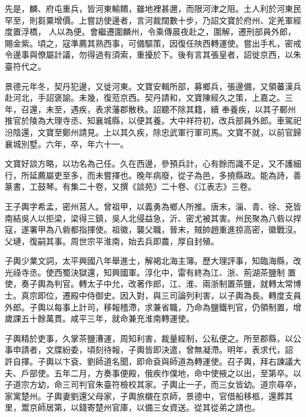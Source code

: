 \begin{pinyinscope}
 先是，麟、府屯重兵，皆河東輸饋，雖地裡甚邇，而限河津之阻。土人利於河東民罕至，則芻粟增價。上嘗訪使邊者，言河裁闊數十步，乃詔文寶於府州、定羌軍經度置浮橋，
 人以為便。會繼遷圍麟州，令乘傳晨夜赴之，圍解，遷刑部員外郎，賜金紫。頃之，寇準薦其熟西事，可備驅策，因復任陜西轉運使。嘗出手札，密戒令邊事與僚屬計議，勿得過有須索，重擾於下。後有言其張皇者，詔徙京西，以朱臺符代之。



 景德元年冬，契丹犯邊，又徙河東。文寶安輯所部，募鄉兵，張邊備，又領蕃漢兵赴河北，手詔褒諭。未幾，復蒞京西。契丹請和，文寶陳經久之策，上嘉之。三年，召還，未至，遇疾，表求藩郡散秩。詔聽不除其籍，續
 奉養疾，以其子鄆州推官於陵為大理寺丞、知襄城縣，以便其養。大中祥符初，改兵部員外郎。車駕祀汾陰還，文寶至鄭州請見。上以其久疾，除忠武軍行軍司馬。文寶不就，以前官歸襄城別墅。六年，卒，年六十一。



 文寶好談方略，以功名為己任。久在西邊，參預兵計，心有餘而識不足，又不護細行，所延薦屬吏至多，而未嘗擇也。晚年病廢，從子為邑，多撓縣政。能為詩，善篆書，工鼓琴。有集二十卷，又撰《談苑》二十卷、《江表志》三卷。



 王子輿字希孟，密州莒人。曾祖甲，以義勇為鄉人所推。唐末，淄、青、徐、兗皆南結吳人以拒梁，梁得三鎮，吳人北侵益急，沂、密尤被其害。州民聚為八砦以捍寇，遂署甲為八砦都指揮使。祖徽，襲父職，晉末，賊帥趙重進掠高密，徽戰沒。父璉，復嗣其事。周世宗平淮南，始去兵即農，厚自封殖。



 子輿少業文詞，太平興國八年舉進士，解褐北海主簿。歷大理評事，知臨海縣，改光祿寺丞。使西蜀決獄還，知興國軍。淳化中，雷有終為江、浙、荊湖茶鹽制
 置使，奏子輿為判官。轉太子中允，改著作郎，江、淮、兩浙制置茶鹽，就轉太常博士。真宗即位，遷殿中侍御史。因入對，與三司論列利害，以子輿為長。轉度支員外郎。子輿以每事上計司，移報稽滯，求兼省職，乃命為鹽鐵判官，仍領制置，增歲課五十餘萬貫。咸平三年，就命兼充淮南轉運使。



 子輿精於吏事，久掌茶鹽漕運，周知利害，裁量經制，公私便之。所至郡縣，以公事申請者，文牒紛委，頃刻待報，子輿皆即決遣，曾無凝滯。明年，表求代，詔
 許自擇。子輿以卞袞、劉師道名聞，即命袞與師道為轉運使。召子輿，拜右諫議大夫、戶部使。五年二月，方奏事便殿，俄疾作僕地，命中使掖之以出，至第卒。以子道宗方幼，命三司判官朱臺符檢校其家。子輿止一子，而三女皆幼。道宗尋卒，家寓楚州。子輿妻劉還父母家，子輿旅櫬在京師，景德中，官借船移柩，還葬其里，鬻京師居第，以錢寄楚州官庫，以備三女資送。從其從弟之請也。




\end{pinyinscope}
